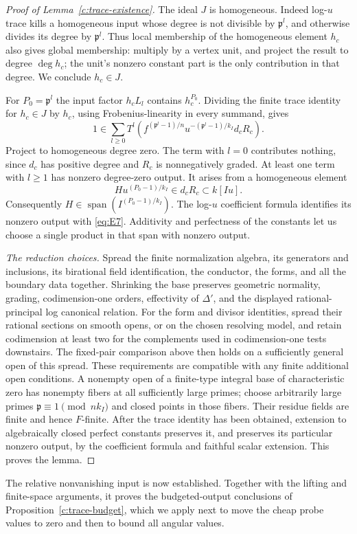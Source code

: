 \begin{proof}[Proof of Lemma~\ref{c:trace-existence}]
The ideal $J$ is homogeneous.  Indeed log-$u$ trace kills a homogeneous
input whose degree is not divisible by $\mathfrak p^l$, and otherwise divides its
degree by $\mathfrak p^l$.  Thus local membership of the homogeneous element $h_c$
also gives global membership: multiply by a vertex unit, and project the
result to degree $\deg h_c$; the unit's nonzero constant part is the only
contribution in that degree.  We conclude $h_c\in J$.

For $P_0=\mathfrak p^l$ the input factor $h_cL_l$ contains $h_c^{P_0}$.
Dividing the finite trace identity for $h_c\in J$ by $h_c$, using
Frobenius-linearity in every summand, gives
\[
 1\in\sum_{l\ge0}T^l\left(
  f^{(\mathfrak p^l-1)/n}u^{-(\mathfrak p^l-1)/k_I}d_cR_c\right).
\]
Project to homogeneous degree zero.  The term with $l=0$ contributes
nothing, since $d_c$ has positive degree and $R_c$ is nonnegatively
graded.  At least one term with $l\ge1$ has nonzero degree-zero output.
It arises from a homogeneous element
\[
 H u^{(P_0-1)/k_I}\in d_cR_c\subset k[Iu].
\]
Consequently $H\in\operatorname{span}(I^{(P_0-1)/k_I})$.
The log-$u$ coefficient formula identifies its nonzero output with
\eqref{eq:E7}.  Additivity and perfectness of the constants let us choose
a single product in that span with nonzero output.

\emph{The reduction choices.}
Spread the finite normalization algebra, its generators and inclusions,
its birational field identification, the conductor, the forms, and all
the boundary data together.  Shrinking the base preserves geometric
normality, grading, codimension-one orders, effectivity of $\Delta'$,
and the displayed rational-principal log canonical relation.  For the
form and divisor identities, spread their rational sections on smooth
opens, or on the chosen resolving model, and retain codimension at least
two for the complements used in codimension-one tests downstairs.
The fixed-pair comparison above then holds on a sufficiently general
open of this spread.  These requirements are compatible with any finite
additional open conditions.  A nonempty open of a finite-type integral
base of characteristic zero has nonempty fibers at all sufficiently
large primes; choose arbitrarily large primes
$\mathfrak p\equiv1\pmod{nk_I}$ and closed points in those fibers.  Their residue
fields are finite and hence $F$-finite.  After the trace identity has been
obtained, extension to algebraically closed perfect constants preserves
it, and preserves its particular nonzero output, by the coefficient
formula and faithful scalar extension.  This proves the lemma.
\end{proof}

The relative nonvanishing input is now established.  Together with the
lifting and finite-space arguments, it proves the budgeted-output
conclusions of Proposition~\ref{c:trace-budget}, which we apply next to
move the cheap probe values to zero and then to bound all angular values.
